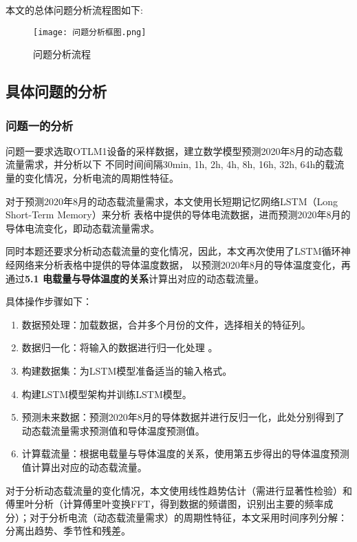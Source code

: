 \documentclass[withoutpreface,bwprint]{cumcmthesis}  %
\begin{document}
	本文的总体问题分析流程图如下:
	
	\begin{figure}[H]
		
		\label{wentifenxi}     %
		\centering
		\texttt{[image: 问题分析框图.png]}
		\caption{问题分析流程}  %
	\end{figure}

 
	\subsection{具体问题的分析}
 
	\subsubsection{问题一的分析}
	问题一要求选取OTLM1设备的采样数据，建立数学模型预测2020年8月的动态载流量需求，并分析以下
        不同时间间隔30min, 1h, 2h, 4h, 8h, 16h, 32h, 64h的载流量的变化情况，分析电流的周期性特征。
	
	对于预测2020年8月的动态载流量需求，本文使用长短期记忆网络LSTM（Long Short-Term Memory）来分析
        表格中提供的导体电流数据，进而预测2020年8月的导体电流变化，即动态载流量需求。
        
        同时本题还要求分析动态载流量的变化情况，因此，本文再次使用了LSTM循环神经网络来分析表格中提供的导体温度数据，
        以预测2020年8月的导体温度变化，再通过\textbf{5.1 电载量与导体温度的关系}计算出对应的动态载流量。
        
        具体操作步骤如下：
        \begin{enumerate}
            \item 数据预处理：加载数据，合并多个月份的文件，选择相关的特征列。
            \item 数据归一化：将输入的数据进行归一化处理 。
            \item 构建数据集：为LSTM模型准备适当的输入格式。
            \item 构建LSTM模型架构并训练LSTM模型。
            \item 预测未来数据：预测2020年8月的导体数据并进行反归一化，此处分别得到了动态载流量需求预测值和导体温度预测值。
            \item 计算载流量：根据电载量与导体温度的关系，使用第五步得出的导体温度预测值计算出对应的动态载流量。
        \end{enumerate}
        
        对于分析动态载流量的变化情况，本文使用线性趋势估计（需进行显著性检验）和傅里叶分析（计算傅里叶变换FFT，得到数据的频谱图，识别出主要的频率成分）；对于分析电流（动态载流量需求）的周期性特征，本文采用时间序列分解：分离出趋势、季节性和残差。
        
\end{document}
